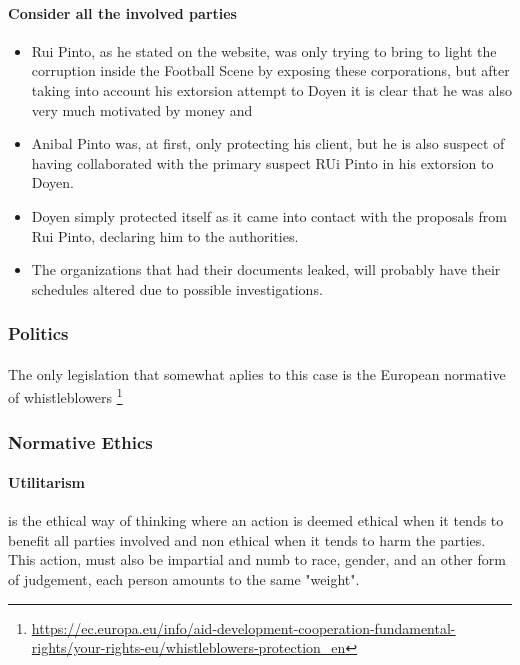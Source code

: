 \paragraph{Consider all the involved parties}
\begin{itemize}
    \item Rui Pinto, as he stated on the website, was only trying to bring to light the corruption inside the Football Scene by exposing these corporations, but after taking into account his extorsion attempt to Doyen it is clear that he was also very much motivated by money and 
    \item Anibal Pinto was, at first, only protecting his client, but he is also suspect of having collaborated with the primary suspect RUi Pinto in his extorsion to Doyen.
    \item Doyen simply protected itself as it came into contact with the proposals from Rui Pinto, declaring him to the authorities.
    \item The organizations that had their documents leaked, will probably have their schedules altered due to possible investigations.
\end{itemize}





\subsubsection{Politics}
\paragraph{}
The only legislation that somewhat aplies to this case is the European normative of whistleblowers
\footnote{\url{https://ec.europa.eu/info/aid-development-cooperation-fundamental-rights/your-rights-eu/whistleblowers-protection_en}}


\subsubsection{Normative Ethics}

\paragraph{Utilitarism}
    is the ethical way of thinking where an action is deemed ethical when it tends to benefit all parties involved and non ethical when it tends to harm the parties.
    This action, must also be impartial and numb to race, gender, and an other form of judgement, each person amounts to the same "weight".

